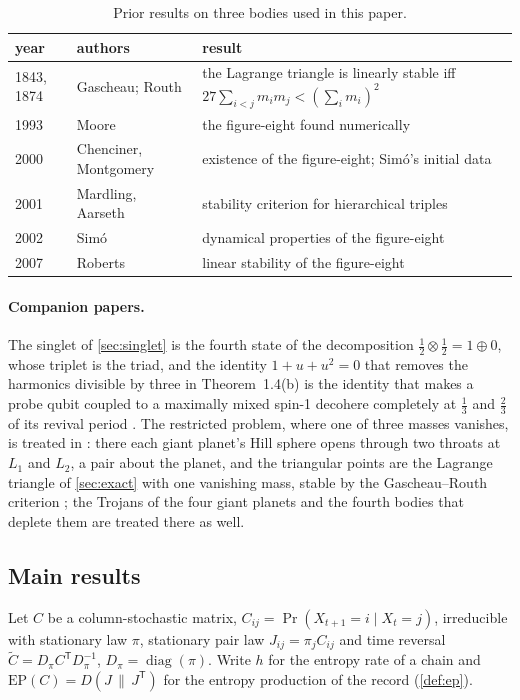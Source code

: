\documentclass[11pt]{article}
\theoremstyle{definition}\newtheorem{definition}[theorem]{Definition}
\theoremstyle{remark}\newtheorem{remark}[theorem]{Remark}
\begin{document}
\begin{table}[!htb]\centering\small
\begin{tabular}{@{}l>{\raggedright\arraybackslash}p{4.2cm}>{\raggedright\arraybackslash}p{8.4cm}@{}}\toprule
year & authors & result\\\midrule
1843, 1874 & Gascheau; Routh \cite{Gascheau,Routh} & the Lagrange triangle is linearly stable iff $27\sum_{i<j}m_im_j<(\sum_im_i)^2$\\
1993 & Moore \cite{Moore} & the figure-eight found numerically\\
2000 & Chenciner, Montgomery \cite{CM} & existence of the figure-eight; Sim\'o's initial data\\
2001 & Mardling, Aarseth \cite{MA} & stability criterion for hierarchical triples\\
2002 & Sim\'o \cite{Simo} & dynamical properties of the figure-eight\\
2007 & Roberts \cite{Roberts} & linear stability of the figure-eight\\\bottomrule
\end{tabular}
\caption{Prior results on three bodies used in this paper.}\label{tab:prior}
\end{table}

\paragraph{Companion papers.} The singlet of \cref{sec:singlet} is the fourth state of the decomposition $\frac12\otimes\frac12=1\oplus0$, whose triplet is the triad, and the identity $1+u+u^2=0$ that removes the harmonics divisible by three in Theorem~1.4(b) is the identity that makes a probe qubit coupled to a maximally mixed spin-1 decohere completely at $\frac13$ and $\frac23$ of its revival period \cite{SQuant}. The restricted problem, where one of three masses vanishes, is treated in \cite{SPlanet}: there each giant planet's Hill sphere opens through two throats at $L_1$ and $L_2$, a pair about the planet, and the triangular points are the Lagrange triangle of \cref{sec:exact} with one vanishing mass, stable by the Gascheau--Routh criterion \cite{Gascheau,Routh}; the Trojans of the four giant planets and the fourth bodies that deplete them are treated there as well.

\subsection{Main results}\label{sec:main}
Let $C$ be a column-stochastic matrix, $C_{ij}=\Pr(X_{t+1}=i\mid X_t=j)$, irreducible with stationary law $\pi$, stationary pair law $J_{ij}=\pi_jC_{ij}$ and time reversal $\tilde C=D_\pi C^{\mathsf T}D_\pi^{-1}$, $D_\pi=\operatorname{diag}(\pi)$. Write $h$ for the entropy rate of a chain and $\mathrm{EP}(C)=D(J\,\|\,J^{\mathsf T})$ for the entropy production of the record (\cref{def:ep}).
\end{document}

